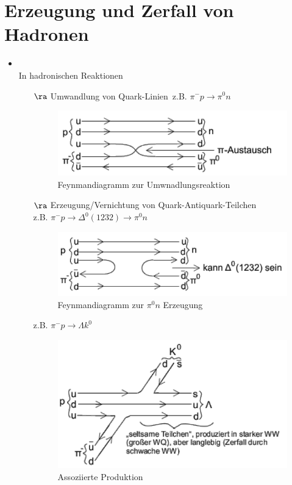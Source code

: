 \section{Erzeugung und Zerfall von Hadronen}
\begin{itemize}
\item {}\\
In hadronischen Reaktionen
\begin{itemize}
\item[$\ra$] \grqq Umwandlung von Quark-Linien\grqq\, z.B. $\pi^- p\rightarrow\pi^0 n$

\begin{figure}[!ht]
\centering
\includegraphics[width=.5\textwidth]{imgs/ep5-fig-7-15.pdf}
\caption{Feynmandiagramm zur Umwnadlungsreaktion \label{fig:7.15}}
\end{figure}

\item[$\ra$] Erzeugung/Vernichtung von Quark-Antiquark-Teilchen\\
z.B. $\pi^- p \rightarrow \Delta^0(1232)\rightarrow\pi^0 n$

\begin{figure}[!ht]
\centering
\includegraphics[width=.5\textwidth]{imgs/ep5-fig-7-16.pdf}
\caption{Feynmandiagramm zur $\pi^0n$ Erzeugung\label{fig:7.16}}
\end{figure}

z.B. $\pi^- p \rightarrow \Lambda k^0$
\begin{figure}[!ht]
\centering
\includegraphics[width=.5\textwidth]{imgs/ep5-fig-7-17.pdf}
\caption{Assoziierte Produktion \label{fig:7.17}}
\end{figure}


\end{itemize}
\end{itemize}

